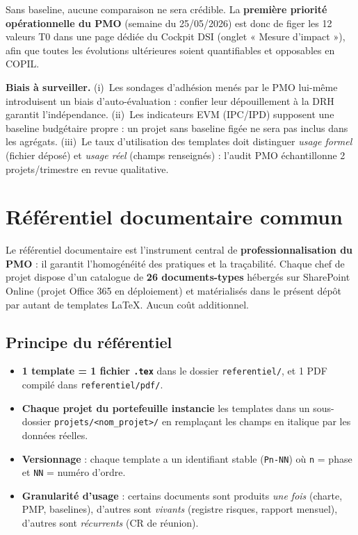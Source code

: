 \documentclass[11pt,a4paper,oneside]{report}
\begin{document}
\begin{reco}
Sans baseline, aucune comparaison ne sera crédible. La \textbf{première priorité opérationnelle du PMO} (semaine du 25/05/2026) est donc de figer les 12 valeurs T0 dans une page dédiée du Cockpit DSI (onglet « Mesure d'impact »), afin que toutes les évolutions ultérieures soient quantifiables et opposables en COPIL.
\end{reco}

\begin{alert}
\textbf{Biais à surveiller.} (i)~Les sondages d'adhésion menés par le PMO lui-même introduisent un biais d'auto-évaluation : confier leur dépouillement à la DRH garantit l'indépendance. (ii)~Les indicateurs EVM (IPC/IPD) supposent une baseline budgétaire propre : un projet sans baseline figée ne sera pas inclus dans les agrégats. (iii)~Le taux d'utilisation des templates doit distinguer \emph{usage formel} (fichier déposé) et \emph{usage réel} (champs renseignés) : l'audit PMO échantillonne 2 projets/trimestre en revue qualitative.
\end{alert}

\newpage

\chapter{Référentiel documentaire commun}

\begin{finding}
Le référentiel documentaire est l'instrument central de \textbf{professionnalisation du PMO} : il garantit l'homogénéité des pratiques et la traçabilité. Chaque chef de projet dispose d'un catalogue de \textbf{26 documents-types} hébergés sur SharePoint Online (projet Office 365 en déploiement) et matérialisés dans le présent dépôt par autant de templates LaTeX. Aucun coût additionnel.
\end{finding}

\section{Principe du référentiel}

\begin{itemize}
  \item \textbf{1 template = 1 fichier \texttt{.tex}} dans le dossier \texttt{referentiel/}, et 1 PDF compilé dans \texttt{referentiel/pdf/}.
  \item \textbf{Chaque projet du portefeuille instancie} les templates dans un sous-dossier \texttt{projets/<nom\_projet>/} en remplaçant les champs en italique par les données réelles.
  \item \textbf{Versionnage} : chaque template a un identifiant stable (\texttt{Pn-NN}) où \texttt{n} = phase et \texttt{NN} = numéro d'ordre.
  \item \textbf{Granularité d'usage} : certains documents sont produits \emph{une fois} (charte, PMP, baselines), d'autres sont \emph{vivants} (registre risques, rapport mensuel), d'autres sont \emph{récurrents} (CR de réunion).
\end{itemize}
\end{document}
